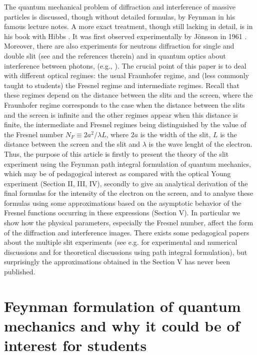 \documentclass[12pt]{article}   %
\begin{document}
The quantum mechanical problem of diffraction and interference of
massive particles is discussed, though without detailed formulas,
by Feynman in his famous lecture notes.\cite{Feynman} A more
exact treatment, though still lacking in detail, is in his book
with Hibbs \cite{FH}. It was first observed experimentally by
J\"onsson in 1961 \cite{Jonsson}. Moreover, there are also
experiments for neutrons diffraction for single and double slit 
(see \cite{Zeilinger} and the references therein)
and in quantum optics about interference between photons,
(e.g., \cite{Mandel}).  
The crucial point of this paper is to deal with different optical regimes: the usual
Fraunhofer regime, and (less commonly taught to students) the
Fresnel regime and intermediate regimes. 
Recall that these regimes depend on the distance between the slits and
the screen, where the Fraunhofer regime corresponds to the case
when the distance between the slits and the screen is infinite and
the other regimes appear when this distance is finite, the
intermediate and Fresnel regimes being distinguished by the value
of the Fresnel number $N_F\equiv 2a^2/\lambda L$, where $2a$ is the
width of the slit, $L$ is the distance between the screen and
the slit and $\lambda$ is the wave lenght of the electron. 
Thus, the purpose of this article is firstly to present the theory of the slit experiment
using the Feynman path integral formulation of quantum mechanics,
which may be of pedagogical interest as compared with the optical
Young experiment (Section II, III, IV), secondly to give an analytical
derivation of the final formulas for the intensity of the electron
on the screen, and to analyse these formulas using some
approximations based on the asymptotic behavior of the Fresnel
functions \cite{Abramowitz} occurring in these expressions (Section V). 
In particular we show how the physical parameters, especially the
Fresnel number, affect the form of the diffraction and
interference images. There exists some pedagogical papers 
about the multiple slit experiments 
(see e.g. \cite{Frabboni} for experimental and numerical discussions
and \cite{Barut} for theoretical discussions using path integral formulation),
but surprisingly the approximations obtained in the Section V has never been published.




\section{Feynman formulation of quantum mechanics and why it could be of interest for students}
\end{document}
